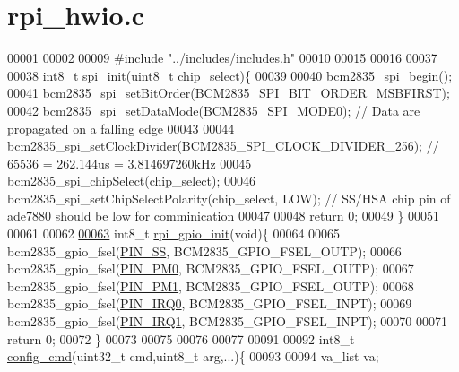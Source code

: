 \hypertarget{a00038}{\section{rpi\-\_\-hwio.\-c}
\label{d8/d41/a00038}
}

\begin{DoxyCode}
00001 
00002    
00009 \textcolor{preprocessor}{#include "../includes/includes.h"}
00010 
00015 
00016 
00037 
\hypertarget{a00038_source_l00038}{}\hyperlink{a00005_ga96ddfd5c89b80852982ba50dd18256f6}{00038} int8\_t \hyperlink{a00005_ga96ddfd5c89b80852982ba50dd18256f6}{spi\_init}(uint8\_t chip\_select)\{
00039     
00040     bcm2835\_spi\_begin();
00041     bcm2835\_spi\_setBitOrder(BCM2835\_SPI\_BIT\_ORDER\_MSBFIRST);    
00042     bcm2835\_spi\_setDataMode(BCM2835\_SPI\_MODE0);                     \textcolor{comment}{// Data are propagated on a falling
       edge }
00043                                                                 
00044     bcm2835\_spi\_setClockDivider(BCM2835\_SPI\_CLOCK\_DIVIDER\_256);     \textcolor{comment}{// 65536 = 262.144us = 3.814697260kHz }
00045     bcm2835\_spi\_chipSelect(chip\_select);                                            
00046     bcm2835\_spi\_setChipSelectPolarity(chip\_select, LOW);            \textcolor{comment}{// SS/HSA chip pin of ade7880 should be
       low for comminication      }
00047 
00048 \textcolor{keywordflow}{return} 0;   
00049 \}
00051 
00061 
00062 
\hypertarget{a00038_source_l00063}{}\hyperlink{a00005_ga156b48448f55534a2f9c805a1f760efa}{00063} int8\_t \hyperlink{a00005_ga156b48448f55534a2f9c805a1f760efa}{rpi\_gpio\_init}(\textcolor{keywordtype}{void})\{
00064     
00065         bcm2835\_gpio\_fsel(\hyperlink{a00039_ab4b553591a495409d4f7cec4b6c3e754}{PIN\_SS},  BCM2835\_GPIO\_FSEL\_OUTP);
00066         bcm2835\_gpio\_fsel(\hyperlink{a00039_aef7884a448449013ba1f8b46b8df5c05}{PIN\_PM0},  BCM2835\_GPIO\_FSEL\_OUTP);
00067         bcm2835\_gpio\_fsel(\hyperlink{a00039_a93e6f13f663a3ca8bcf6efe2022c9b78}{PIN\_PM1},  BCM2835\_GPIO\_FSEL\_OUTP);
00068         bcm2835\_gpio\_fsel(\hyperlink{a00039_a99ed780c4dd8d2e01c5ff66064306abf}{PIN\_IRQ0}, BCM2835\_GPIO\_FSEL\_INPT);
00069         bcm2835\_gpio\_fsel(\hyperlink{a00039_a14204df3192ece77fc1b651c6625bc30}{PIN\_IRQ1}, BCM2835\_GPIO\_FSEL\_INPT);
00070             
00071 \textcolor{keywordflow}{return} 0;   
00072 \}
00073 
00075 
00076 
00077 
00091 
00092 int8\_t \hyperlink{a00005_ga369ee0e8379941cbc2c79b90ec3292da}{config\_cmd}(uint32\_t cmd,uint8\_t arg,...)\{
00093     
00094            va\_list va;

\end{DoxyCode}
